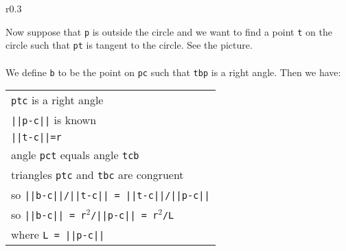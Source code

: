 \documentclass[12pt]{article}
\begin{document}
\begin{minipage}{\textwidth}\raggedright
\label{TANGENT-PICTURE}
\begin{wrapfigure}{r}{0.3\textwidth}
\end{wrapfigure}
Now suppose that {\tt p} is outside the circle and we want to find
a point {\tt t} on the circle such that {\tt pt} is tangent to the
circle.  See the picture. \\
~ \\
\label{FINDING-TANGENT-POINT}
We define {\tt b} to be the point on {\tt pc} such that
{\tt tbp} is a right angle.  Then we have: \\
\hspace*{0.2in}\begin{tabular}{@{}l} \\
    {\tt ptc} is a right angle \\
    {\tt ||p-c||} is known \\
    {\tt ||t-c||=r} \\
    angle {\tt pct} equals angle {\tt tcb} \\
    triangles {\tt ptc} and {\tt tbc} are congruent \\
    so {\tt \small ||b-c||/||t-c|| = ||t-c||/||p-c||} \\
    so {\tt \small ||b-c|| = r$^2$/||p-c|| = r$^2$/L} \\
    where {\tt L = ||p-c||} \\
    \end{tabular}
\end{minipage} \\
\end{document}
